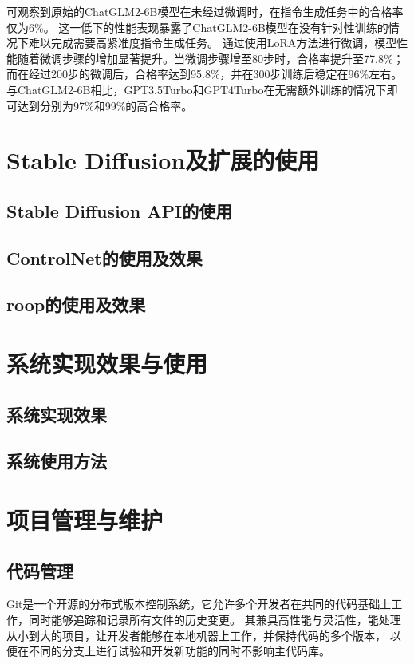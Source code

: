 \documentclass[a4paper,AutoFakeBold,oneside,12pt]{book}
\begin{document}
可观察到原始的ChatGLM2-6B模型在未经过微调时，在指令生成任务中的合格率仅为6\%。
这一低下的性能表现暴露了ChatGLM2-6B模型在没有针对性训练的情况下难以完成需要高紧准度指令生成任务。
通过使用LoRA方法进行微调，模型性能随着微调步骤的增加显著提升。当微调步骤增至80步时，合格率提升至77.8\%；
而在经过200步的微调后，合格率达到95.8\%，并在300步训练后稳定在96\%左右。
与ChatGLM2-6B相比，GPT3.5Turbo和GPT4Turbo在无需额外训练的情况下即可达到分别为97\%和99\%的高合格率。

\chapter{Stable Diffusion及扩展的使用}
\section{Stable Diffusion API的使用}
\section{ControlNet的使用及效果}
\section{roop的使用及效果}

\chapter{系统实现效果与使用}
\section{系统实现效果}
\section{系统使用方法}

\chapter{项目管理与维护} %
\section{代码管理}
Git是一个开源的分布式版本控制系统，它允许多个开发者在共同的代码基础上工作，同时能够追踪和记录所有文件的历史变更。
其兼具高性能与灵活性，能处理从小到大的项目，让开发者能够在本地机器上工作，并保持代码的多个版本，
以便在不同的分支上进行试验和开发新功能的同时不影响主代码库。
\end{document}
